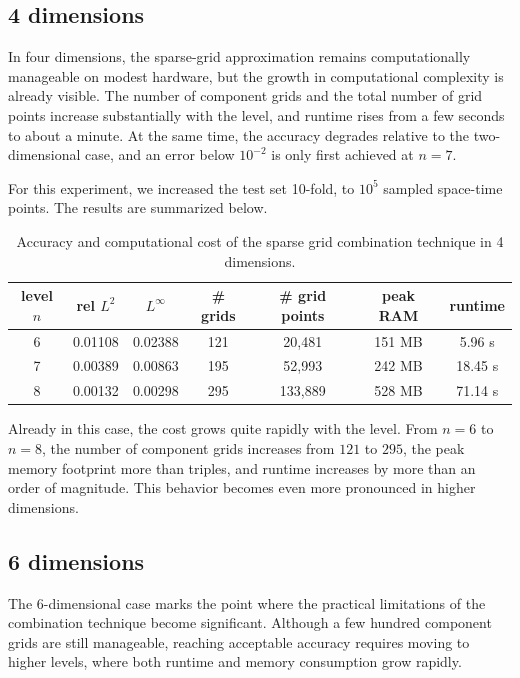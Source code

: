 \subsection{4 dimensions}
In four dimensions, the sparse-grid approximation remains computationally manageable on modest hardware,
but the growth in computational complexity is already visible.
The number of component grids and the total number of grid points increase substantially with the level, and runtime rises from a few seconds to about a minute.
At the same time, the accuracy degrades relative to the two-dimensional case, and an error below $10^{-2}$ is only first achieved at $n=7$.

For this experiment, we increased the test set 10-fold, to $10^5$ sampled space-time points.
The results are summarized below.
\begin{table}[ht]
\centering
\begin{tabular}{ |c|c|c|c|c|c|c| } 
\hline
level $n$ & rel $L^2$ & $L^\infty$ & \# grids & \# grid points & peak RAM & runtime \\
\hline
6 & 0.01108 & 0.02388 & 121 & 20,481 & 151 MB & 5.96 s\\
\hline
7 & 0.00389 & 0.00863 & 195 & 52,993 & 242 MB & 18.45 s\\
\hline
8 & 0.00132 & 0.00298 & 295 & 133,889 & 528 MB & 71.14 s \\
\hline
\end{tabular}
\caption{Accuracy and computational cost of the sparse grid combination technique in 4 dimensions.}
\label{tab:sg-4d}
\end{table}
Already in this case, the cost grows quite rapidly with the level.
From $n=6$ to $n=8$, the number of component grids increases from $121$ to $295$,
the peak memory footprint more than triples,
and runtime increases by more than an order of magnitude.
This behavior becomes even more pronounced in higher dimensions.


\subsection{6 dimensions}
The 6-dimensional case marks the point where the practical limitations of the combination technique become significant.
Although a few hundred component grids are still manageable, reaching acceptable accuracy requires moving to higher levels,
where both runtime and memory consumption grow rapidly.

